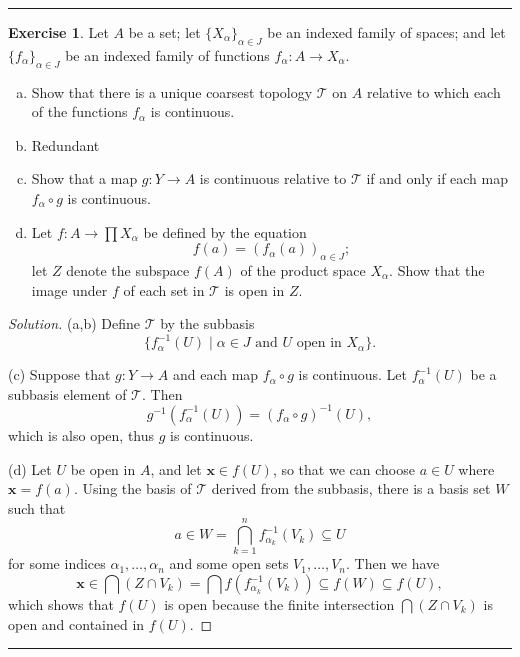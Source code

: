 \documentclass{article}
\theoremstyle{definition}
\newtheorem{exercise}{Exercise}[section]
\begin{document}
\hrule

\begin{exercise}
  Let $A$ be a set; let $\{X_\alpha\}_{\alpha\in J}$ be an indexed family of spaces; and let $\{f_\alpha\}_{\alpha\in J}$ be an indexed family of functions $f_\alpha:A\to X_\alpha$.
  \begin{enumerate}[(a)]
    \item Show that there is a unique coarsest topology $\mathcal{T}$ on $A$ relative to which each of the functions $f_\alpha$ is continuous.
    \item Redundant
    \item Show that a map $g:Y\to A$ is continuous relative to $\mathcal{T}$ if and only if each map $f_\alpha\circ g$ is continuous.
    \item Let $f:A\to\prod X_\alpha$ be defined by the equation $$f(a) = (f_\alpha(a))_{\alpha\in J};$$
    let $Z$ denote the subspace $f(A)$ of the product space $X_\alpha$. Show that the image under $f$ of each set in $\mathcal{T}$ is open in $Z$.
  \end{enumerate}
\end{exercise}
\begin{proof}[Solution]
  (a,b) Define $\mathcal{T}$ by the subbasis
  $$\{f_\alpha^{-1}(U)\mid \alpha\in J\text{ and $U$ open in $X_\alpha$}\}.$$

  (c) Suppose that $g:Y\to A$ and each map $f_\alpha\circ g$ is continuous. Let $f_\alpha^{-1}(U)$ be a subbasis element of $\mathcal{T}$. Then
  $$g^{-1}(f_\alpha^{-1}(U)) = (f_\alpha\circ g)^{-1}(U),$$
  which is also open, thus $g$ is continuous.

  (d) Let $U$ be open in $A$, and let $\mathbf{x}\in f(U)$, so that we can choose $a\in U$ where $\mathbf{x} = f(a)$. Using the basis of $\mathcal{T}$ derived from the subbasis, there is a basis set $W$ such that
  $$a\in W = \bigcap_{k=1}^n f_{\alpha_k}^{-1}(V_k)\subseteq U$$
  for some indices $\alpha_1,\dots,\alpha_n$ and some open sets $V_1,\dots,V_n$. Then we have
  $$\mathbf{x}\in\bigcap (Z\cap V_k) = \bigcap f(f_{\alpha_k}^{-1}(V_k))
    \subseteq f(W) \subseteq f(U),$$
  which shows that $f(U)$ is open because the finite intersection $\bigcap (Z\cap V_k)$ is open and contained in $f(U)$.
\end{proof}

\hrule
\end{document}

